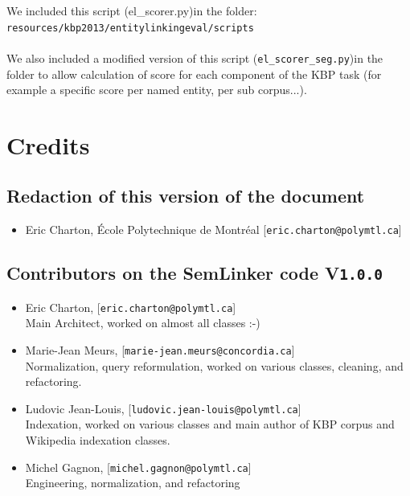 \documentclass[11pt]{article}
\newcommand{\seml}{SemLinker}
\def\version{{\tt 1.0.0}}
\begin{document}
We included this script (el\_scorer.py)in the folder:\\
\texttt{resources/kbp2013/entitylinkingeval/scripts}\\
\\
We also included a modified version of this script (\texttt{el\_scorer\_seg.py})in the folder to allow calculation of score for each component of the KBP task 
(for example a specific score per named entity, per sub corpus...).


\section{Credits}
\label{sec:credits}

\subsection*{Redaction of this version of the document}
\begin{itemize}
 \item[] Eric Charton, \'{E}cole Polytechnique de Montr\'eal [\texttt{{\small{eric.charton@polymtl.ca}}}]
 \end{itemize}


\subsection*{Contributors on the \seml{} code V\version}

\begin{itemize}
 \item[] Eric Charton, [\texttt{{\small{eric.charton@polymtl.ca}}}]\\ 
	Main Architect, worked  on almost all classes :-)\\

\item[] Marie-Jean Meurs, [\texttt{{\small{marie-jean.meurs@concordia.ca}}}]\\
	Normalization, query reformulation, worked on various classes, cleaning, and refactoring.\\

\item[] Ludovic Jean-Louis, [\texttt{{\small{ludovic.jean-louis@polymtl.ca}}}]\\ 
	Indexation, worked on various classes and main author of KBP corpus and Wikipedia indexation classes.\\

\item[] Michel Gagnon, [\texttt{{\small{michel.gagnon@polymtl.ca}}}]\\
	Engineering, normalization, and refactoring
\end{itemize}
\end{document}
